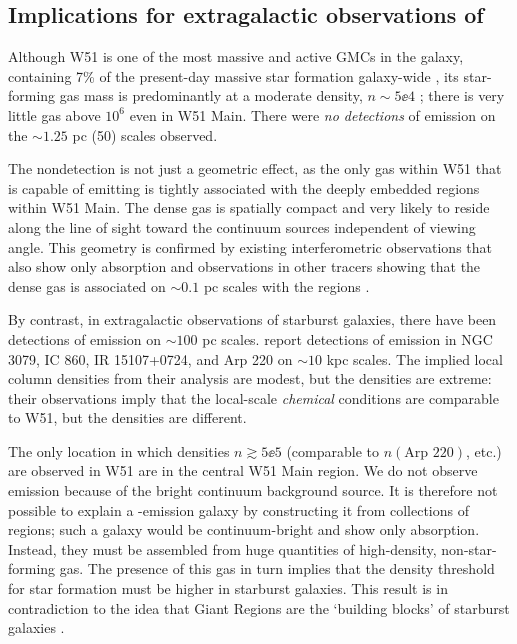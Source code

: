 \subsection{Implications for extragalactic observations of \formaldehyde}
\label{sec:exgal}
Although W51 is one of the most massive and active GMCs in the galaxy,
containing 7\% of the present-day massive star formation galaxy-wide
\citep{Urquhart2014a}, its star-forming gas mass is predominantly at a moderate
density, $n\sim5\ee{4}$ \percc; there is very little gas above $10^6$ \percc even
in W51 Main.  There were \emph{no detections} of \formaldehyde emission on the
$\sim1.25$ pc (50\arcsec) scales observed.  

The nondetection is not just a geometric effect,
as the only gas within W51 that is capable of emitting is tightly associated
with the deeply embedded \uchii regions within W51 Main.  The dense gas is
spatially compact and very likely to reside along the line of sight toward the
continuum sources independent of viewing angle.  This geometry is confirmed by
existing interferometric observations that also show only absorption
\citep{Martin-Pintado1985a,Arnal1985a} and observations in other tracers
showing that the dense gas is associated on $\sim0.1$ pc scales with the
\uchii regions \citep{Zhang1997a,Zhang1998a}.

By contrast, in extragalactic observations of starburst galaxies, there have
been detections of \formaldehyde emission on $\sim100$ pc scales.
\citet{Mangum2013a} report
detections of \formaldehyde \oneone emission in NGC 3079, IC 860, IR
15107+0724, and Arp 220 on $\sim10$ kpc scales.  The implied local column
densities from their analysis are modest, but the densities are extreme: their
observations imply that the local-scale \emph{chemical} conditions are
comparable to W51, but the densities are different.

The only location in which densities $n\gtrsim5\ee{5}$ \percc (comparable to
$n(\textrm{Arp } 220)$, etc.) are observed in W51 are in the central W51
Main region.  We do not observe emission because of the bright
continuum background source.  It is therefore not possible to explain a
\formaldehyde-emission galaxy by constructing it from collections of \uchii
regions; such a galaxy would be continuum-bright and show only \formaldehyde
absorption.  Instead, they must be assembled from huge quantities of
high-density, non-star-forming gas.  The presence of this gas in turn
implies that the density threshold for star formation must be higher in
starburst galaxies.
This result is in contradiction to the
idea that Giant \hii Regions are the `building blocks' of starburst galaxies
\citep[e.g.][]{Miura2014a}.

